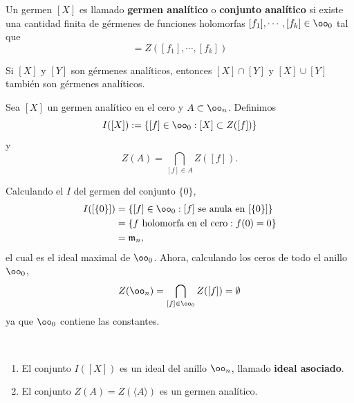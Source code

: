 	\begin{definition}
			Un germen $[X]$ es llamado \textbf{germen analítico} o \textbf{conjunto analítico} si existe una cantidad finita de gérmenes de funciones holomorfas $[f_1],\cdots,[f_k]\in\oo_0$ tal que
			\begin{equation*}
				[X]=Z([f_1],\cdots,[f_k])
			\end{equation*}
	\end{definition}
		
	\begin{propo}
			Si $[X]$ y $[Y]$  son gérmenes analíticos,  entonces $[X]\cap [Y]$ y $[X]\cup [Y]$ también son gérmenes analíticos.
	\end{propo}
	
		\begin{definition}
			Sea $[X]$ un germen analítico en el cero y $A\subset\oo_n$. Definimos
			\begin{equation*}
				I([X]):=\{[f]\in\oo_0:[X]\subset Z([f])\}
			\end{equation*}
			y
			\begin{equation*}
				Z(A)=\bigcap_{[f]\in A}Z([f]).
			\end{equation*}
		\end{definition}
		
	\begin{example}
		Calculando el $I$ del germen del conjunto $\{0\}$,
		\begin{align*}
			I([\{0\}])&=\{[f]\in\oo_0:[f]\text{ se anula  en }[\{0\}]\}\\
			&=\{f\text{ holomorfa en el cero}:f(0)=0\}\\
			&=\mathfrak{m}_n,
		\end{align*}
		el cual es el ideal maximal de $\oo_0$.
		Ahora, calculando los ceros de todo el anillo $\oo_0$,
		\begin{equation*}
			Z(\oo_n)=\bigcap_{[f]\in\oo_0}Z([f])=\emptyset
		\end{equation*}
		ya que $\oo_0$ contiene las constantes.
	\end{example}
	
	
	\begin{propo} $ $
		\begin{enumerate}
			\item El conjunto $I([X])$ es un ideal del anillo $\oo_n$, llamado \textbf{ideal asociado}.
			\item El conjunto $Z(A)=Z(\langle A\rangle)$ es  un germen analítico.
		\end{enumerate}
	\end{propo}
	
